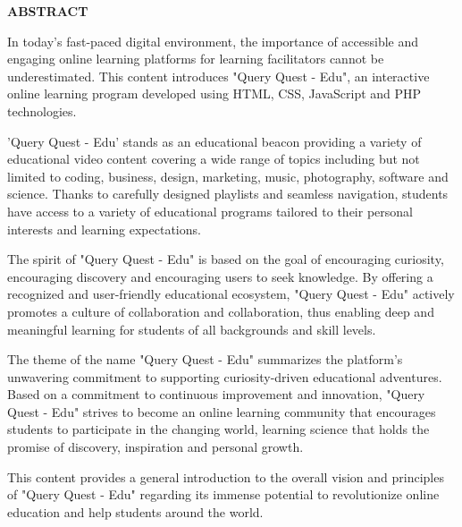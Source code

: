 \begin{center}
\thispagestyle{empty}
\vspace{2cm}
\LARGE{\textbf{ABSTRACT}}\\[1.0cm]
\end{center}
\thispagestyle{empty}
In today's fast-paced digital environment, the importance of accessible and engaging online learning platforms for learning facilitators cannot be underestimated. This content introduces "Query Quest - Edu", an interactive online learning program developed using HTML, CSS, JavaScript and PHP technologies.\newline

'Query Quest - Edu' stands as an educational beacon providing a variety of educational video content covering a wide range of topics including but not limited to coding, business, design, marketing, music, photography, software and science. Thanks to carefully designed playlists and seamless navigation, students have access to a variety of educational programs tailored to their personal interests and learning expectations.\newline

The spirit of "Query Quest - Edu" is based on the goal of encouraging curiosity, encouraging discovery and encouraging users to seek knowledge. By offering a recognized and user-friendly educational ecosystem, "Query Quest - Edu" actively promotes a culture of collaboration and collaboration, thus enabling deep and meaningful learning for students of all backgrounds and skill levels.\newline

The theme of the name "Query Quest - Edu" summarizes the platform's unwavering commitment to supporting curiosity-driven educational adventures. Based on a commitment to continuous improvement and innovation, "Query Quest - Edu" strives to become an online learning community that encourages students to participate in the changing world, learning science that holds the promise of discovery, inspiration and personal growth.\newline

This content provides a general introduction to the overall vision and principles of "Query Quest - Edu" regarding its immense potential to revolutionize online education and help students around the world.

 \vspace{0.5cm}


